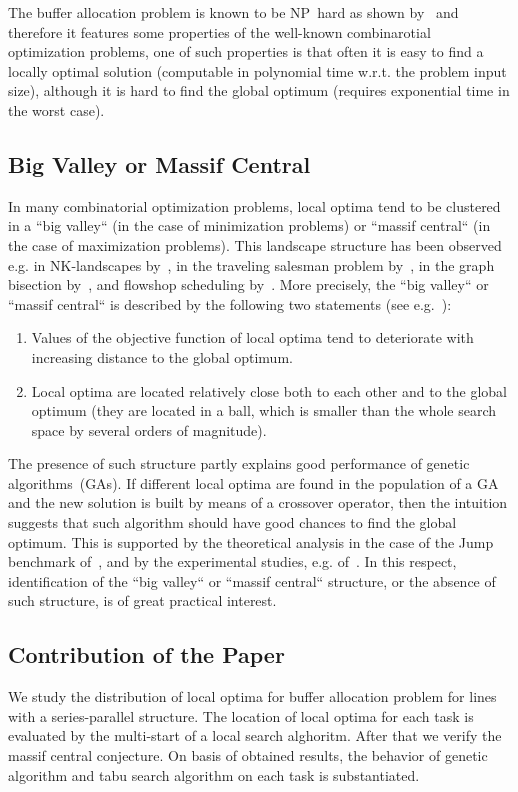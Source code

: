 \documentclass{ifacconf}
\begin{document}
The buffer allocation problem is known to be NP~hard as shown by~\cite{DEKS2013,DEKS2018}  and therefore it features some properties of the
well-known combinarotial optimization problems, one of such properties is that often it is easy to find a locally optimal solution (computable in polynomial time 
w.r.t. the problem input size), although it is hard to find the global optimum (requires exponential time in the worst case).  

\subsection{Big Valley or Massif Central}\label{subsec:landscapes}

In many combinatorial optimization problems, local optima tend to be clustered in a ``big valley`` (in  the case of minimization problems) or
``massif central`` (in  the case of maximization problems). This landscape structure has been observed  e.g. in 
NK-landscapes by~\cite{KL87}, in the traveling salesman problem by~\cite{Boese,Hains}, in the graph bisection by~\cite{Boese}, and 
flowshop scheduling by~\cite{Reeves99}. More precisely, the ``big valley`` or
``massif central`` is described by the following two statements (see e.g.~\cite{Boese}):
\begin{enumerate}
\item Values of the objective function of local optima tend to deteriorate with increasing distance to the global optimum.
\item Local optima are located relatively close both to each other and to the global optimum (they are located in a ball, which is smaller than 
the whole search space by several orders of magnitude).
\end{enumerate}
The presence of such structure partly explains good performance of genetic
algorithms~(GAs). If different local optima are found in the population of a GA and
the new solution is built by means of a crossover operator, 
then the intuition suggests that such algorithm should have good chances to find the
global optimum. This is supported by the theoretical analysis in the case of the Jump benchmark of~\cite{DFKKLOS18}, and
by the experimental studies, e.g. of~\cite{Hains}.
In this respect, identification of the ``big valley`` or
``massif central`` structure, or the absence of such structure, is of great practical interest.

\subsection{Contribution of the Paper}
We study the distribution of local optima for buffer allocation problem for lines with a series-parallel structure. 
The location of local optima for each task is evaluated by the multi-start of a local search alghoritm. 
After that we verify the massif central conjecture. On basis of obtained results, the 
behavior of genetic algorithm and tabu search algorithm on each task is substantiated.
\end{document}
